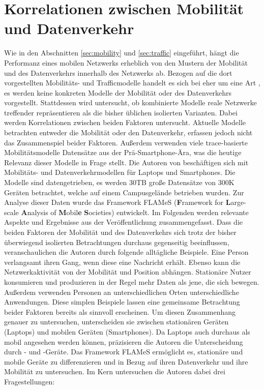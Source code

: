 \documentclass[12pt, a4paper]{article}
\begin{document}
\section{Korrelationen zwischen Mobilität und Datenverkehr}
\label{sec:correlations}

Wie in den Abschnitten \ref{sec:mobility} und \ref{sec:traffic} eingeführt, hängt die Performanz eines mobilen
Netzwerks erheblich von den Mustern der Mobilität und des Datenverkehrs innerhalb des Netzwerks ab.
Bezogen auf die dort vorgestellten Mobilitäts- und Trafficmodelle handelt es sich bei \cite{Alipour2018}
eher um eine Art , es werden keine konkreten Modelle der Mobilität oder des Datenverkehrs vorgestellt.
Stattdessen wird untersucht, ob kombinierte Modelle reale Netzwerke treffender repräsentieren als die bisher
üblichen isolierten Varianten. Dabei werden Korrelationen zwischen beiden Faktoren untersucht.
\newline\newline
Aktuelle Modelle betrachten entweder die Mobilität oder den Datenverkehr, erfassen jedoch nicht das Zusammenspiel beider Faktoren.
Außerdem verwenden viele trace-basierte Mobilitätsmodelle Datensätze aus der Prä-Smartphone-Ära,
was die heutige Relevanz dieser Modelle in Frage stellt. \cite{Alipour2018}\newline
Die Autoren von \cite{Alipour2018} beschäftigen sich mit Mobilitäts- und Datenverkehrmodellen für Laptops und Smartphones.
Die Modelle sind datengetrieben, es werden $30$\textsc{TB} große Datensätze von $300$\textsc{K} Geräten betrachtet, 
welche auf einem Campusgelände betrieben wurden. Zur Analyse dieser Daten wurde das Framework FLAMeS (\textbf{F}ramework for 
\textbf{L}arge-scale \textbf{A}nalysis of \textbf{M}obil\textbf{e} \textbf{S}ocieties) entwickelt.
Im Folgenden werden relevante Aspekte und Ergebnisse aus der Veröffentlichung zusammengefasst.\newline\newline
Dass die beiden Faktoren der Mobilität und des Datenverkehrs sich trotz der bisher überwiegend isolierten Betrachtungen
durchaus gegenseitig beeinflussen, veranschaulichen die Autoren durch folgende alltägliche Beispiele. 
Eine Person verlangsamt ihren Gang, wenn diese eine Nachricht erhält. Ebenso kann die Netzwerkaktivität von der
Mobilität und Position abhängen. Stationäre Nutzer konsumieren und produzieren in der Regel mehr Daten als jene, 
die sich bewegen. Außerdem verwenden Personen an unterschiedlichen Orten unterschiedliche Anwendungen.
Diese simplen Beispiele lassen eine gemeinsame Betrachtung beider Faktoren bereits als sinnvoll erscheinen.
Um diesen Zusammenhang genauer zu untersuchen, unterscheiden sie zwischen stationären Geräten (Laptops) und mobilen Geräten
(Smartphones). Da Laptops auch durchaus als mobil angesehen werden können, präzisieren die Autoren die Unterscheidung
durch - und -Geräte. Das Framework FLAMeS ermöglicht es, stationäre und
mobile Geräte zu differenzieren und in Bezug auf ihren Datenverkehr und ihre Mobilität zu untersuchen.
Im Kern untersuchen die Autoren dabei drei Fragestellungen:
\end{document}
